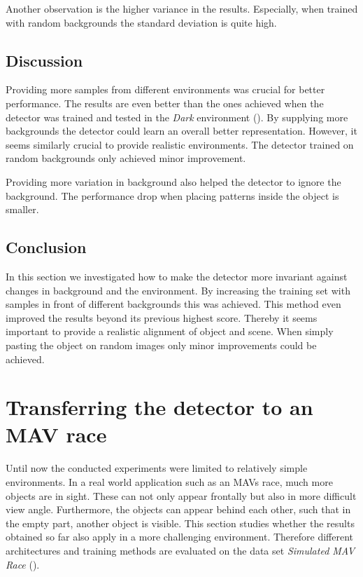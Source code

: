 Another observation is the higher variance in the results. Especially, when trained with random backgrounds the standard deviation is quite high. 


\subsection{Discussion}

Providing more samples from different environments was crucial for better performance. The results are even better than the ones achieved when the detector was trained and tested in the \textit{Dark} environment (). By supplying more backgrounds the detector could learn an overall better representation. However, it seems similarly crucial to provide realistic environments. The detector trained on random backgrounds only achieved minor improvement.

Providing more variation in background also helped the detector to ignore the background. The performance drop when placing patterns inside the object is smaller.

\subsection{Conclusion}

In this section we investigated how to make the detector more invariant against changes in background and the environment. By increasing the training set with samples in front of different backgrounds this was achieved. This method even improved the results beyond its previous highest score. Thereby it seems important to provide a realistic alignment of object and scene. When simply pasting the object on random images only minor improvements could be achieved.

\section{Transferring the detector to an \ac{MAV} race}

Until now the conducted experiments were limited to relatively simple environments. In a real world application such as an \acp{MAV} race, much more objects are in sight. These can not only appear frontally but also in more difficult view angle. Furthermore, the objects can appear behind each other, such that in the empty part, another object is visible. This section studies whether the results obtained so far also apply in a more challenging environment. Therefore different architectures and training methods are evaluated on the data set \textit{Simulated MAV Race} ().

